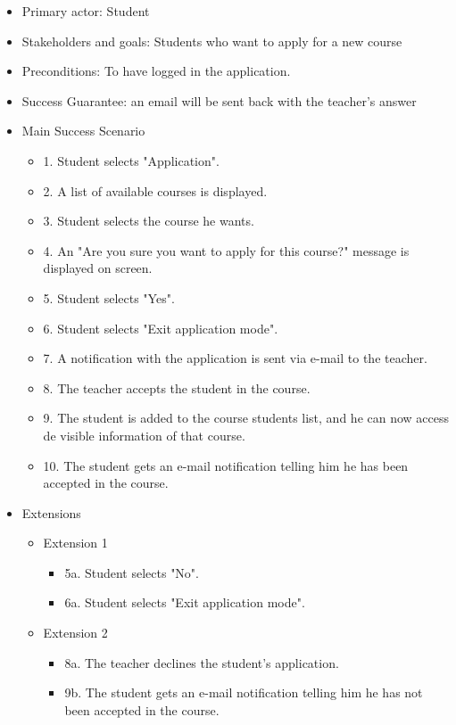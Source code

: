 \documentclass{article}
\begin{document}
\begin{enumerate}
\begin{enumerate}
\begin{enumerate}
			
			\begin{itemize}
				\item Primary actor: Student
				\item Stakeholders and goals: Students who want to apply for a new course
				\item Preconditions: To have logged in the application.
				\item Success Guarantee: an email will be sent back with the teacher's answer
				\item Main Success Scenario
				\begin{itemize}
					\item 1. Student selects "Application".
					\item 2. A list of available courses is displayed.
					\item 3. Student selects the course he wants.
					\item 4. An "Are you sure you want to apply for this course?" message is displayed on screen.
					\item 5. Student selects "Yes".
					\item 6. Student selects "Exit application mode".
					\item 7. A notification with the application is sent via e-mail to the teacher.
					\item 8. The teacher accepts the student in the course.
					\item 9. The student is added to the course students list, and he can now access de visible information of that course.
					\item 10. The student gets an e-mail notification telling him he has been accepted in the course.
				\end{itemize}
				\item Extensions
				\begin{itemize}
					\item Extension 1
					\begin{itemize}
						\item 5a. Student selects "No".
						\item 6a. Student selects "Exit application mode".
					\end{itemize}
					\item Extension 2
					\begin{itemize}
						\item 8a. The teacher declines the student's application.
						\item 9b. The student gets an e-mail notification telling him he has not been accepted in the course.
					\end{itemize}
					

\end{itemize}
\end{itemize}
\end{enumerate}
\end{enumerate}
\end{enumerate}
\end{document}
